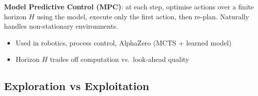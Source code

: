\begin{tcbitemize}[ skin=sectionraster ]
    \textbf{Model Predictive Control (MPC)}: at each step, optimise actions
    over a finite horizon $H$ using the model, execute only the first action,
    then re-plan. Naturally handles non-stationary environments.

    \begin{itemize}
        \item Used in robotics, process control, AlphaZero (MCTS + learned model)
        \item Horizon $H$ trades off computation vs.\ look-ahead quality
    \end{itemize}

    \end{tcbitemize}

    \subsection{Exploration vs Exploitation}
